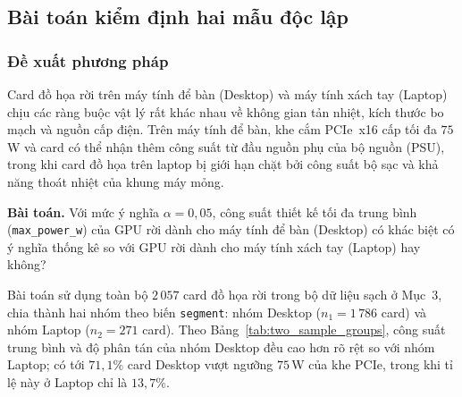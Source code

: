 \subsection{Bài toán kiểm định hai mẫu độc lập}

\subsubsection{Đề xuất phương pháp}
Card đồ họa rời trên máy tính để bàn (Desktop) và máy tính xách tay (Laptop) chịu các ràng buộc vật lý rất khác nhau về không gian tản nhiệt, kích thước bo mạch và nguồn cấp điện. Trên máy tính để bàn, khe cắm PCIe~x16 cấp tối đa $75$\,W và card có thể nhận thêm công suất từ đầu nguồn phụ của bộ nguồn (PSU), trong khi card đồ họa trên laptop bị giới hạn chặt bởi công suất bộ sạc và khả năng thoát nhiệt của khung máy mỏng.

\textbf{Bài toán.} Với mức ý nghĩa $\alpha = 0{,}05$, công suất thiết kế tối đa trung bình (\texttt{max\_power\_w}) của GPU rời dành cho máy tính để bàn (Desktop) có khác biệt có ý nghĩa thống kê so với GPU rời dành cho máy tính xách tay (Laptop) hay không?

Bài toán sử dụng toàn bộ $2\,057$ card đồ họa rời trong bộ dữ liệu sạch ở Mục~3, chia thành hai nhóm theo biến \texttt{segment}: nhóm Desktop ($n_1 = 1\,786$ card) và nhóm Laptop ($n_2 = 271$ card). Theo Bảng~\ref{tab:two_sample_groups}, công suất trung bình và độ phân tán của nhóm Desktop đều cao hơn rõ rệt so với nhóm Laptop; có tới $71{,}1\%$ card Desktop vượt ngưỡng $75$\,W của khe PCIe, trong khi tỉ lệ này ở Laptop chỉ là $13{,}7\%$.

\begin{table}[H]
  \centering
  \caption{Đặc trưng mẫu của công suất tối đa (W) theo phân khúc thiết bị; $p$ là giá trị $p$ của kiểm định Shapiro--Wilk ở Mục~5.2.2.a.}
  \label{tab:two_sample_groups}
\end{table}

